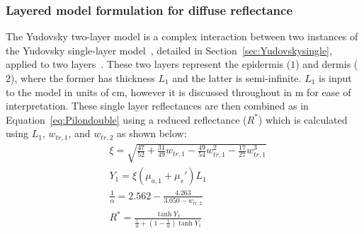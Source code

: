 \subsubsection{Layered model formulation for diffuse reflectance}\label{sec:Yudovsky2009}
% 
The Yudovsky two-layer model is a complex interaction between two instances of the Yudovsky single-layer model~\citep{Yudovsky2009}, detailed in Section~\ref{sec:Yudovskysingle}, applied to two layers~\citep{Yudovsky2009}. 
These two layers represent the epidermis ($1$) and dermis ($2$), where the former has thickness $L_1$ and the latter is semi-infinite. $L_1$ is input to the model in units of cm, however it is discussed throughout in \textmu m for ease of interpretation.
These single layer reflectances are then combined as in Equation~\eqref{eq:Pilondouble} using a reduced reflectance ($R^*$) which is calculated using $L_1$, $w_{tr, 1}$, and $w_{tr,2}$ as 
shown below:
\begin{equation}
\begin{aligned}
    & \xi = \sqrt{\frac{47}{52} + \frac{31}{49}w_{tr, 1} - \frac{49}{54}w_{tr, 1}^2 - \frac{17}{27}w_{tr, 1}^3} \\
    & Y_1 = \xi(\mu_{a,1} + \mu_s')L_1 \\
    & \frac{1}{\alpha} = 2.562 - \frac{4.263}{3.050 - w_{tr, 2}} \\
    & R^* = \frac{\tanh{Y_1}}{\frac{1}{\alpha} + (1 - \frac{1}{\alpha})\tanh{Y_1}} \\
\end{aligned}
\label{eq:reducedR}
\end{equation} 
